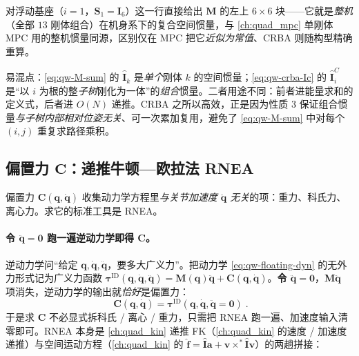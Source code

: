 \noindent{}对浮动基座（$i=1$，$\mathbf{S}_1=\mathbf{I}_6$）这一行直接给出 $\boldsymbol{M}$ 的左上 $6\times6$ 块——它就是\emph{整机}（全部 $13$ 刚体组合）在机身系下的复合空间惯量，与 \cref{ch:quad_mpc} 单刚体 MPC 用的整机惯量同源，区别仅在 MPC 把它\emph{近似为常值}、CRBA 则随构型精确重算。

\begin{note}\label{note:qw-crba-Ic}
易混点：\cref{eq:qw-M-sum} 的 $\hat{\mathbf{I}}_k$ 是\emph{单个}刚体 $k$ 的空间惯量；\cref{eq:qw-crba-Ic} 的 $\hat{\mathbf{I}}_i^{C}$ 是“以 $i$ 为根的整\emph{子树}刚化为一体”的\emph{组合}惯量。二者用途不同：前者进能量求和的定义式，后者进 $O(N)$ 递推。CRBA 之所以高效，正是因为性质 3 保证组合惯量\emph{与子树内部相对位姿无关}、可一次累加复用，避免了 \cref{eq:qw-M-sum} 中对每个 $(i,j)$ 重复求路径乘积。
\end{note}

\subsection{偏置力 \texorpdfstring{$\boldsymbol{C}$}{C}：递推牛顿—欧拉法 RNEA}
\label{subsec:qw-rnea}

偏置力 $\boldsymbol{C}(\boldsymbol{q},\dot{\boldsymbol{q}})$ 收集动力学方程里\emph{与关节加速度 $\ddot{\boldsymbol{q}}$ 无关}的项：重力、科氏力、离心力。求它的标准工具是 RNEA\cite{featherstone2008rigid}。

\paragraph{令 $\ddot{\boldsymbol{q}}=\mathbf{0}$ 跑一遍逆动力学即得 $\boldsymbol{C}$。}
逆动力学问“给定 $\boldsymbol{q},\dot{\boldsymbol{q}},\ddot{\boldsymbol{q}}$，要多大广义力”。把动力学 \cref{eq:qw-floating-dyn} 的无外力形式记为广义力函数 $\boldsymbol{\tau}^{\mathrm{ID}}(\boldsymbol{q},\dot{\boldsymbol{q}},\ddot{\boldsymbol{q}})=\boldsymbol{M}(\boldsymbol{q})\ddot{\boldsymbol{q}}+\boldsymbol{C}(\boldsymbol{q},\dot{\boldsymbol{q}})$。\textbf{令 $\ddot{\boldsymbol{q}}=\mathbf{0}$}，$\boldsymbol{M}\ddot{\boldsymbol{q}}$ 项消失，逆动力学的输出就\emph{恰好}是偏置力\cite{yu2021quadruped}：
\begin{equation}
  \boxed{\;\boldsymbol{C}(\boldsymbol{q},\dot{\boldsymbol{q}})=\boldsymbol{\tau}^{\mathrm{ID}}(\boldsymbol{q},\dot{\boldsymbol{q}},\ddot{\boldsymbol{q}}=\mathbf{0})\;}.
  \label{eq:qw-C-rnea}
\end{equation}
于是求 $\boldsymbol{C}$ 不必显式拆科氏 / 离心 / 重力，只需把 RNEA 跑一遍、加速度输入清零即可。RNEA 本身是 \cref{ch:quad_kin} 递推 FK（\cref{ch:quad_kin} 的速度 / 加速度递推）与空间运动方程（\cref{ch:quad_kin} 的 $\hat{\boldsymbol{f}}=\hat{\mathbf{I}}\boldsymbol{a}+\boldsymbol{v}\times^{*}\hat{\mathbf{I}}\boldsymbol{v}$）的两趟拼接：

